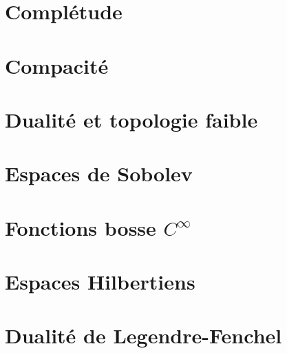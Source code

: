 \documentclass[11pt]{article}
\begin{document}
\newpage
\section{Complétude}
\label{sec:complet}


\newpage
\section{Compacité}
\label{sec:compact}


\newpage
\section{Dualité et topologie faible}
\label{sec:dual}


\newpage
\section{Espaces de Sobolev}
\label{sec:Sobolev}


%




\appendix

\section{Fonctions bosse $C^\infty$}
\label{sec:bosse}


\section{Espaces Hilbertiens}
\label{sec:Hilbert}


\section{Dualité de Legendre-Fenchel}
\label{sec:LegendreFenchel}

\end{document}
